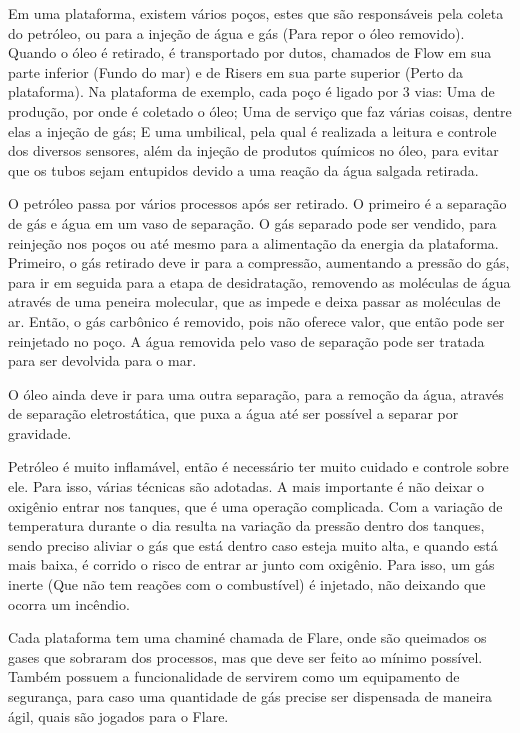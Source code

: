 \documentclass{article}
\begin{document}
Em uma plataforma, existem vários poços, estes que são responsáveis pela coleta do petróleo, ou para a injeção de água e gás (Para repor o óleo removido). Quando o óleo é retirado, é transportado por dutos, chamados de Flow em sua parte inferior (Fundo do mar) e de Risers em sua parte superior (Perto da plataforma). Na plataforma de exemplo, cada poço é ligado por 3 vias: Uma de produção, por onde é coletado o óleo; Uma de serviço que faz várias coisas, dentre elas a injeção de gás; E uma umbilical, pela qual é realizada a leitura e controle dos diversos sensores, além da injeção de produtos químicos no óleo, para evitar que os tubos sejam entupidos devido a uma reação da água salgada retirada. 

O petróleo passa por vários processos após ser retirado. O primeiro é a separação de gás e água em um vaso de separação. O gás separado pode ser vendido, para reinjeção nos poços ou até mesmo para a alimentação da energia da plataforma. Primeiro, o gás retirado deve ir para a compressão, aumentando a pressão do gás, para ir em seguida para a etapa de desidratação, removendo as moléculas de água através de uma peneira molecular, que as impede e deixa passar as moléculas de ar. Então, o gás carbônico é removido, pois não oferece valor, que então pode ser reinjetado no poço. A água removida pelo vaso de separação pode ser tratada para ser devolvida para o mar. 

O óleo ainda deve ir para uma outra separação, para a remoção da água, através de separação eletrostática, que puxa a água até ser possível a separar por gravidade. 

Petróleo é muito inflamável, então é necessário ter muito cuidado e controle sobre ele. Para isso, várias técnicas são adotadas. A mais importante é não deixar o oxigênio entrar nos tanques, que é uma operação complicada. Com a variação de temperatura durante o dia resulta na variação da pressão dentro dos tanques, sendo preciso aliviar o gás que está dentro caso esteja muito alta, e quando está mais baixa, é corrido o risco de entrar ar junto com oxigênio. Para isso, um gás inerte (Que não tem reações com o combustível) é injetado, não deixando que ocorra um incêndio.  

Cada plataforma tem uma chaminé chamada de Flare, onde são queimados os gases que sobraram dos processos, mas que deve ser feito ao mínimo possível. Também possuem a funcionalidade de servirem como um equipamento de segurança, para caso uma quantidade de gás precise ser dispensada de maneira ágil, quais são jogados para o Flare. 
\end{document}

